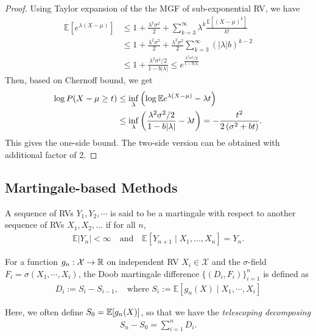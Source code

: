 \begin{proof} Using Taylor expansion of the the MGF of sub-exponential RV, we have
\begin{align*}
\mathbb{E}\left[e^{\lambda(X-\mu)}\right] & \leq 1+\frac{\lambda^{2} \sigma^{2}}{2}+\sum_{k=3}^{\infty} \lambda^{k} \frac{\mathbb{E}\left[(X-\mu)^{k}\right]}{k !} \\
& \leq 1+\frac{\lambda^{2} \sigma^{2}}{2}+\frac{\lambda^{2} \sigma^{2}}{2} \sum_{k=3}^{\infty}(|\lambda| b)^{k-2} \\
& \leq 1+\frac{\lambda^{2} \sigma^{2} / 2}{1-b|\lambda|} \leq e^{\frac{\lambda^{2} \sigma^{2} / 2}{1-b|\lambda|}}
\end{align*}
Then, based on Chernoff bound, we get
\begin{align*}
\log  P(X - \mu \geq t) & \leq \inf_{\lambda} \left( \log \mathbb{E}{e^{\lambda(X - \mu)}} - \lambda t \right) \\
& \leq \inf_{\lambda}\left(\frac{\lambda^{2} \sigma^{2} / 2}{1-b|\lambda|} - \lambda t  \right) =  -\frac{t^{2}}{2\left(\sigma^{2}+b t\right)}.
\end{align*}
This gives the one-side bound. The two-side version can be obtained with additional factor of 2.
\end{proof}

\subsection{Martingale-based Methods}
\begin{definition}[Martingale]
A sequence of RVs $Y_1, Y_2, \cdots$ is said to be a martingale with respect to another sequence of RVs $X_1, X_2, ...$ if for all $n$,
\begin{align*}
    \mathbb{E} \vert Y_{n}\vert < \infty \quad \text{and} \quad \mathbb{E} [Y_{n+1}\mid X_{1},\ldots ,X_{n}] = Y_{n}.
\end{align*}

\end{definition}

\begin{definition} 
For a function $g_n: \mathcal{X} \rightarrow \mathbb{R}$ on independent RV $X_i \in \mathcal{X}$ and the $\sigma$-field $F_i = \sigma(X_1, \cdots, X_i)$, the Doob martingale difference $\{(D_i, F_i)\}_{i=1}^n$ is defined as
\begin{align*}
    D_i := S_i - S_{i-1},\quad \text{where } S_i := \mathbb{E}[g_n(X) \mid X_1, \cdots, X_i]
\end{align*}
\end{definition}
Here, we often define $S_0 = \mathbb{E}[g_n(X)]$, so that we have the \textit{telescoping decomposing}
\begin{align*}
    S_n - S_0 = \sum_{i=1}^n D_i.
\end{align*}

